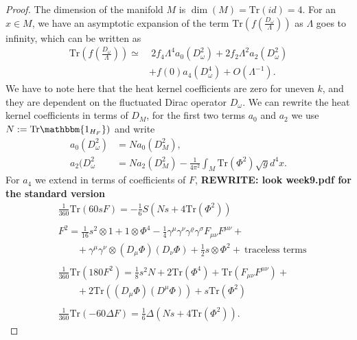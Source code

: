 \begin{proof}
     The dimension of the manifold $M$ is $\dim(M) = \text{Tr}(id) =4$. For
     an $x \in M$, we have an asymptotic expansion of the term
     $\text{Tr}(f(\frac{D_\omega}{\Lambda}))$ as $\Lambda$ goes to infinity,
     which can be written as
     \begin{align}
         \text{Tr}(f(\frac{D_\omega}{\Lambda})) \simeq& \ 2f_4 \Lambda ^4
         a_0(D_\omega ^2)+ 2f_2\Lambda^2 a_2(D_\omega^2)\nonumber \\&+ f(0) a_4(D_\omega^4)
         +O(\Lambda^{-1}).\label{eq:trheatkernel}
     \end{align}
     We have to note here that the heat kernel coefficients are zero for uneven $k$,
     and they are dependent on the fluctuated Dirac operator
     $D_\omega$. We can rewrite the heat kernel coefficients in terms of $D_M$,
     for the first two terms $a_0$ and $a_2$ we use $N:=
     \text{Tr}\mathbbm{1_{H_F}})$ and write
     \begin{align}
         a_0(D_\omega^2) &= Na_0(D_M^2),\\
         a_2(D_\omega^2 &= Na_2(D_M^2) - \frac{1}{4\pi^2}\int_M
         \text{Tr}(\Phi^2)\sqrt{g}d^4x.
     \end{align}
     For $a_4$ we extend in terms of coefficients of $F$, \textbf{REWRITE: look week9.pdf
     for the standard version}
     \begin{align}
         &\frac{1}{360}\text{Tr}(60sF)= -\frac{1}{6}S(Ns + 4
         \text{Tr}(\Phi^2))\\
        \nonumber\\
         &F^2 = \frac{1}{16}s^2\otimes 1 + 1\otimes \Phi^4 - \frac{1}{4}
         \gamma^\mu\gamma^\nu \gamma^\varrho\gamma^\sigma F_{\mu\nu}F^{\mu\nu}+\\
         &\;\;\;\;\;\;\;+\gamma^\mu\gamma^\nu\otimes(D_\mu\Phi)(D_\nu
         \Phi)+\frac{1}{2}s\otimes \Phi^2 + \ \text{traceless terms}\\
         \nonumber\\
         &\frac{1}{360}\text{Tr}(180F^2) = \frac{1}{8}s^2N + 2\text{Tr}(\Phi^4)
         + \text{Tr}(F_{\mu\nu}F^{\mu\nu}) +\\
         &\;\;\;\;\;\;\;+2\text{Tr}((D_\mu\Phi)(D^\mu\Phi))
         + s\text{Tr}(\Phi^2)\\
         \nonumber\\
         &\frac{1}{360}\text{Tr}(-60\Delta F)=
         \frac{1}{6}\Delta(Ns+4\text{Tr}(\Phi^2)).
     \end{align}

\end{proof}
